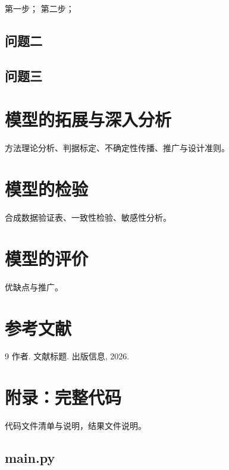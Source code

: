 \documentclass[withoutpreface,bwprint]{cumcmthesis}
\begin{document}
\begin{algorithm}[H]
\caption{求解算法}
\begin{algorithmic}[1]
\State 第一步；
\State 第二步；
\end{algorithmic}
\end{algorithm}

\subsection{问题二}

\subsection{问题三}

\section{模型的拓展与深入分析}

方法理论分析、判据标定、不确定性传播、推广与设计准则。

\section{模型的检验}

合成数据验证表、一致性检验、敏感性分析。

\section{模型的评价}

优缺点与推广。

\section{参考文献}

\begin{thebibliography}{9}
 作者. 文献标题. 出版信息, 2026.
\end{thebibliography}

\appendix
\section{附录：完整代码}

代码文件清单与说明，结果文件说明。

\subsection{main.py}

\end{document}

